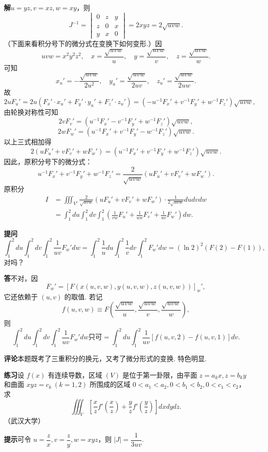 \documentclass[UTF8,12pt,a4paper,fontset=fandol]{ctexart}
\begin{document}
\noindent\textbf{解}\quad $u=yz,v=xz,w=xy$，则
\[
J^{-1}=
\begin{vmatrix}
0&z&y\\
z&0&x\\
y&x&0
\end{vmatrix}
=2xyz=2\sqrt{uvw}.
\]
（下面来看积分号下的微分式在变换下如何变形.）因
\[
uvw=x^2y^2z^2,\quad
x=\frac{\sqrt{uvw}}u,\quad
y=\frac{\sqrt{uvw}}v,\quad
z=\frac{\sqrt{uvw}}w.
\]
可知
\[
x_u'=-\frac{\sqrt{uvw}}{2u^2},\quad
y_u'=\frac{\sqrt{uvw}}{2uv},\quad
z_u'=\frac{\sqrt{uvw}}{2uw}.
\]
故
\[
2uF_u'=2u(F_x'\cdot x_u'+F_y'\cdot y_u'+F_z'\cdot z_u')
=(-u^{-1}F_x'+v^{-1}F_y'+w^{-1}F_z')\sqrt{uvw},
\]
由轮换对称性可知
\[
2vF_v'=(u^{-1}F_x'-v^{-1}F_y'+w^{-1}F_z')\sqrt{uvw},
\]
\[
2wF_w'=(u^{-1}F_x'+v^{-1}F_y'-w^{-1}F_z')\sqrt{uvw}.
\]
以上三式相加得
\[
2(uF_u'+vF_v'+wF_w')
=(u^{-1}F_x'+v^{-1}F_y'+w^{-1}F_z')\sqrt{uvw}.
\]
因此，原积分号下的微分式：
\[
u^{-1}F_x'+v^{-1}F_y'+w^{-1}F_z'
=\frac2{\sqrt{uvw}}(uF_u'+vF_v'+wF_w').
\]
原积分
\[
\begin{aligned}
I&=\iiint_{V'}\frac2{\sqrt{uvw}}(uF_u'+vF_v'+wF_w')\cdot\frac1{2\sqrt{uvw}}dudvdw\\
&=\int_1^2du\int_1^2dv\int_1^2
\left(\frac1{vw}F_u'+\frac1{uw}F_v'+\frac1{uv}F_w'\right)dw.
\end{aligned}
\]

\noindent\textbf{提问}\quad
\[
\int_1^2du\int_1^2dv\int_1^2\frac1{uv}F_w'dw
=\int_1^2\frac1u du\int_1^2\frac1v dv\int_1^2F_w'dw
=(\ln2)^2(F(2)-F(1)),
\]
对吗？

\noindent\textbf{答}\quad 不对，因
\[
F_w'=\left[F(x(u,v,w),y(u,v,w),z(u,v,w))\right]_w',
\]
它还依赖于 $(u,v)$ 的取值. 若记
\[
f(u,v,w)\equiv F\left(\frac{\sqrt{uvw}}u,\frac{\sqrt{uvw}}v,\frac{\sqrt{uvw}}w\right),
\]
则
\[
\int_1^2du\int_1^2dv\int_1^2\frac1{uv}F_w'dw
\text{只可}=\int_1^2du\int_1^2\frac1{uv}[f(u,v,2)-f(u,v,1)]dv.
\]

\noindent\textbf{评论}\quad 本题既考了三重积分的换元，又考了微分形式的变换. 特色明显.

\noindent\textbf{练习}\quad 设 $f(x)$ 有连续导数，区域 $(V)$ 是位于第一卦限，由平面 $z=a_kx,z=b_ky$ 和曲面 $xyz=c_k\ (k=1,2)$ 所围成的区域 $0<a_1<a_2,0<b_1<b_2,0<c_1<c_2$，求
\[
\iiint_V\left[\frac xz f'\left(\frac xz\right)+
\frac yz f'\left(\frac yz\right)\right]dxdydz.
\]
（武汉大学）

\noindent\textbf{提示}\quad 可令 $u=\dfrac zx,v=\dfrac zy,w=xyz$，则 $|J|=\dfrac1{3uv}$.
\end{document}
